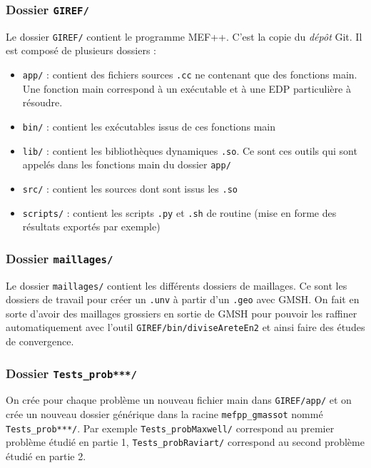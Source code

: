 \documentclass[a4paper,12pt]{article}
\begin{document}
\subsubsection{Dossier \texttt{GIREF/}}
Le dossier \texttt{GIREF/} contient le programme MEF++. C'est la copie du \emph{dépôt} Git. Il est composé de plusieurs dossiers :
\begin{itemize}
\item \texttt{app/} : contient des fichiers sources \texttt{.cc} ne contenant que des fonctions main. Une fonction main correspond à un exécutable et à une EDP particulière à résoudre.
\item \texttt{bin/} : contient les exécutables issus de ces fonctions main
\item \texttt{lib/} : contient les bibliothèques dynamiques \texttt{.so}. Ce sont ces outils qui sont appelés dans les fonctions main du dossier \texttt{app/}
\item \texttt{src/} : contient les sources dont sont issus les \texttt{.so}
\item \texttt{scripts/} : contient les scripts \texttt{.py} et \texttt{.sh} de routine (mise en forme des résultats exportés par exemple)
\end{itemize} 
\subsubsection{Dossier \texttt{maillages/} }

Le dossier \texttt{maillages/} contient les différents dossiers de maillages. Ce sont les dossiers de travail pour créer un \texttt{.unv} à partir d'un \texttt{.geo} avec GMSH.
On fait en sorte d'avoir des maillages grossiers en sortie de GMSH pour pouvoir les raffiner automatiquement avec l'outil \texttt{GIREF/bin/diviseAreteEn2} et ainsi faire des études de convergence.

\subsubsection{Dossier \texttt{Tests\_prob***/}}

On crée pour chaque problème un nouveau fichier main dans \texttt{GIREF/app/} et on crée un nouveau dossier générique dans la racine \texttt{mefpp\_gmassot} nommé
\texttt{Tests\_prob***/}. Par exemple \texttt{Tests\_probMaxwell/} correspond au premier problème étudié en partie 1, \texttt{Tests\_probRaviart/} correspond au second problème étudié en partie 2.
\end{document}

